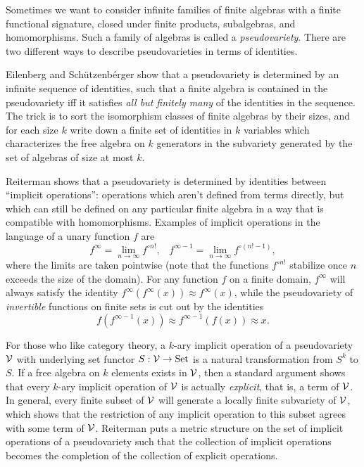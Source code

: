 \documentclass[letterpaper,11pt]{article}
\begin{document}
\begin{rem} Sometimes we want to consider infinite families of finite algebras with a finite functional signature, closed under finite products, subalgebras, and homomorphisms. Such a family of algebras is called a \emph{pseudovariety}. There are two different ways to describe pseudovarieties in terms of identities.

Eilenberg and Sch{\"u}tzenb{\'e}rger \cite{pseudovarieties-ultimate} show that a pseudovariety is determined by an infinite sequence of identities, such that a finite algebra is contained in the pseudovariety iff it satisfies \emph{all but finitely many} of the identities in the sequence. The trick is to sort the isomorphism classes of finite algebras by their sizes, and for each size $k$ write down a finite set of identities in $k$ variables which characterizes the free algebra on $k$ generators in the subvariety generated by the set of algebras of size at most $k$.

Reiterman \cite{pseudovarieties-implicit} shows that a pseudovariety is determined by identities between ``implicit operations'': operations which aren't defined from terms directly, but which can still be defined on any particular finite algebra in a way that is compatible with homomorphisms. Examples of implicit operations in the language of a unary function $f$ are
\[
f^\infty = \lim_{n \rightarrow \infty} f^{\circ n!}, \;\;\; f^{\infty-1} = \lim_{n \rightarrow \infty} f^{\circ (n!-1)},
\]
where the limits are taken pointwise (note that the functions $f^{\circ n!}$ stabilize once $n$ exceeds the size of the domain). For any function $f$ on a finite domain, $f^\infty$ will always satisfy the identity $f^\infty(f^\infty(x)) \approx f^\infty(x)$, while the pseudovariety of \emph{invertible} functions on finite sets is cut out by the identities
\[
f(f^{\infty-1}(x)) \approx f^{\infty-1}(f(x)) \approx x.
\]

For those who like category theory, a $k$-ary implicit operation of a pseudovariety $\mathcal{V}$ with underlying set functor $S : \mathcal{V} \rightarrow \text{Set}$ is a natural transformation from $S^k$ to $S$. If a free algebra on $k$ elements exists in $\mathcal{V}$, then a standard argument shows that every $k$-ary implicit operation of $\mathcal{V}$ is actually \emph{explicit}, that is, a term of $\mathcal{V}$. In general, every finite subset of $\mathcal{V}$ will generate a locally finite subvariety of $\mathcal{V}$, which shows that the restriction of any implicit operation to this subset agrees with some term of $\mathcal{V}$. Reiterman \cite{pseudovarieties-implicit} puts a metric structure on the set of implicit operations of a pseudovariety such that the collection of implicit operations becomes the completion of the collection of explicit operations.
\end{rem}
\end{document}

